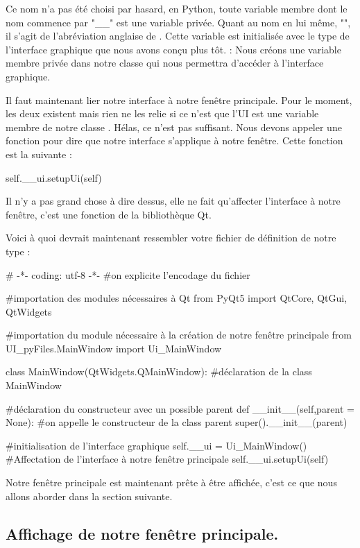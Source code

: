 Ce nom n'a pas été choisi par hasard, en Python, toute variable membre dont le nom commence par "\_\_" est une variable privée. Quant au nom en lui même,  "\textcolor{green}{}", il s'agit de l'abréviation anglaise de .\newline
Cette variable est initialisée avec le type de l'interface graphique que nous avons conçu plus tôt.\newline
{} : Nous créons une variable membre privée dans notre classe qui nous permettra d'accéder à l'interface graphique.\smallSkip

Il faut maintenant lier notre interface à notre fenêtre principale. Pour le moment, les deux existent mais rien ne les relie si ce n'est que l'UI est une variable membre de notre classe . Hélas, ce n'est pas suffisant. Nous devons appeler une fonction pour dire que notre interface s'applique à notre fenêtre. Cette fonction est la suivante :
\begin{pyCode}
self.__ui.setupUi(self)
\end{pyCode}
Il n'y a pas grand chose à dire dessus, elle ne fait qu'affecter l'interface à notre fenêtre, c'est une fonction de la bibliothèque Qt.\smallSkip

Voici à quoi devrait maintenant ressembler votre fichier de définition de notre type  :
\begin{pyCode}
# -*- coding: utf-8 -*-
#on explicite l’encodage du fichier

#importation des modules nécessaires à Qt
from PyQt5 import QtCore, QtGui, QtWidgets

#importation du module nécessaire à la création de notre fenêtre principale
from UI_pyFiles.MainWindow import Ui_MainWindow

class MainWindow(QtWidgets.QMainWindow): #déclaration de la class MainWindow

	#déclaration du constructeur avec un possible parent
	def __init__(self,parent = None):
		#on appelle le constructeur de la class parent
		super().__init__(parent)

		#initialisation de l'interface graphique
		self.__ui = Ui_MainWindow()
		#Affectation de l'interface à notre fenêtre principale
		self.__ui.setupUi(self)
\end{pyCode}


Notre fenêtre principale est maintenant prête à être affichée, c'est ce que nous allons aborder dans la section suivante.


\subsection{Affichage de notre fenêtre principale.}

